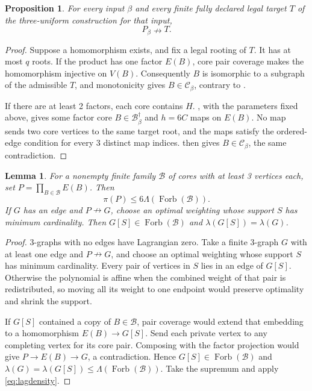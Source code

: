 \documentclass[10pt]{article}
\numberwithin{equation}{section}
\newtheorem{lemma}[lemma]{Lemma}\aliascntresetthe{lemma}
\newtheorem{proposition}[proposition]{Proposition}\aliascntresetthe{proposition}
\theoremstyle{definition}
\newcommand{\Forb}{\operatorname{Forb}}\newcommand{\Ext}{\operatorname{Ext}}
\begin{document}
\begin{proposition}
\label{prop:final-singleton-target-exclusion}
For every input $\beta$ and every finite fully declared legal target $T$ of the three-uniform construction for that input,
\[
 P_\beta\nrightarrow T.
\]
\end{proposition}
\begin{proof}
Suppose a homomorphism exists, and fix a legal rooting of $T$. It has at most $q$ roots. If the product has one factor $E(B)$, core pair coverage makes the homomorphism injective on $V(B)$. Consequently $B$ is isomorphic to a subgraph of the admissible $T$, and monotonicity gives $B\in\mathcal C_\beta$, contrary to .

If there are at least 2 factors, each core contains $H$.
,
with the parameters fixed above, gives some factor core $B\in\mathcal B^\dagger_\beta$ and $h=6C$ maps on $E(B)$. No map sends two core vertices to the same target root, and the maps satisfy the ordered-edge condition for every 3 distinct map indices.
 then gives
$B\in\mathcal C_\beta$, the same contradiction.
\end{proof}

\begin{lemma}
\label{lem:final-singleton-upper-transfer}
For a nonempty finite family $\mathcal B$ of cores with at least 3 vertices each, set $P=\prod_{B\in\mathcal B}E(B)$. Then
\[
 \pi(P)\le6\Lambda(\Forb(\mathcal B)).
\]
If $G$ has an edge and $P\nrightarrow G$, choose an optimal weighting whose support $S$ has minimum cardinality. Then $G[S]\in\Forb(\mathcal B)$ and $\lambda(G[S])=\lambda(G)$.
\end{lemma}
\begin{proof}
$3$-graphs with no edges have Lagrangian zero. Take a finite $3$-graph $G$ with at least one edge and $P\nrightarrow G$, and choose an optimal weighting whose support $S$ has minimum cardinality. Every pair of vertices in $S$ lies in an edge of $G[S]$. Otherwise the polynomial is affine when the combined weight of that pair is redistributed, so moving all its weight to one endpoint would preserve optimality and shrink the support.

If $G[S]$ contained a copy of $B\in\mathcal B$, pair coverage would extend that embedding to a homomorphism $E(B)\to G[S]$. Send each private vertex to any completing vertex for its core pair. Composing with the factor projection would give $P\to E(B)\to G$, a contradiction. Hence $G[S]\in\Forb(\mathcal B)$ and $\lambda(G)=\lambda(G[S])\le\Lambda(\Forb(\mathcal B))$. Take the supremum and apply \eqref{eq:lagdensity}.
\end{proof}
\end{document}
